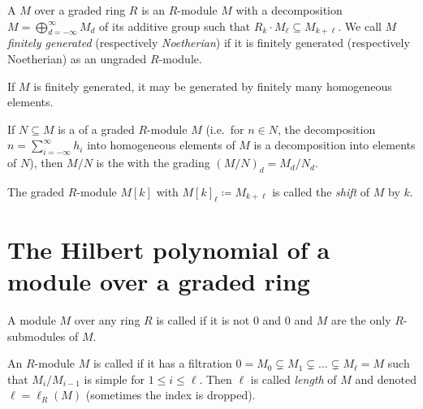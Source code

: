 \documentclass[a4paper,parskip=half,numbers=enddot, DIV=12]{scrreprt}
\begin{document}
\begin{defi}
    A  $M$ over a graded ring $R$ is an $R$-module $M$ with a decomposition $M=\bigoplus_{d=-\infty}^\infty M_d$ of its additive group such that $R_k\cdot M_\ell \subseteq M_{k+\ell}$. We call $M$ \emph{finitely generated} (respectively \emph{Noetherian}) if it is finitely generated (respectively Noetherian) as an ungraded $R$-module. 
\end{defi}
\begin{rem}
    If $M$ is finitely generated, it may be generated by finitely many homogeneous elements.
\end{rem}
\begin{defi}
    \begin{alphanumerate}
        \item {}
            If $N\subseteq M$ is a  of a graded $R$-module $M$ (i.e.\ for $n\in N$, the decomposition $n=\sum_{i=-\infty}^\infty h_i$ into homogeneous elements of $M$ is a decomposition into elements of $N$), then $M/N$ is the  with the grading $(M/N)_d = M_d/N_d$.
        \item   
            The graded $R$-module $M[k]$ with $M[k]_\ell \coloneqq M_{k+\ell}$ is called the \emph{shift} of $M$ by $k$.
    \end{alphanumerate}
\end{defi}

\section{The Hilbert polynomial of a module over a graded ring}

\begin{defi}
    \begin{alphanumerate}
    \item 
        A module $M$ over any ring $R$ is called  if it is not $0$ and $0$ and $M$ are the only $R$-submodules of $M$.
    \item {}
        An $R$-module $M$ is called  if it has a filtration $0 = M_0\subsetneq M_1\subsetneq\ldots\subsetneq M_\ell = M$ such that $M_i/M_{i-1}$ is simple for $1\leq i\leq\ell$. Then $\ell$ is called \emph{length} of $M$ and denoted $\ell=\ell_R(M)$ (sometimes the index is dropped). 
    \end{alphanumerate}
\end{defi}
\end{document}
